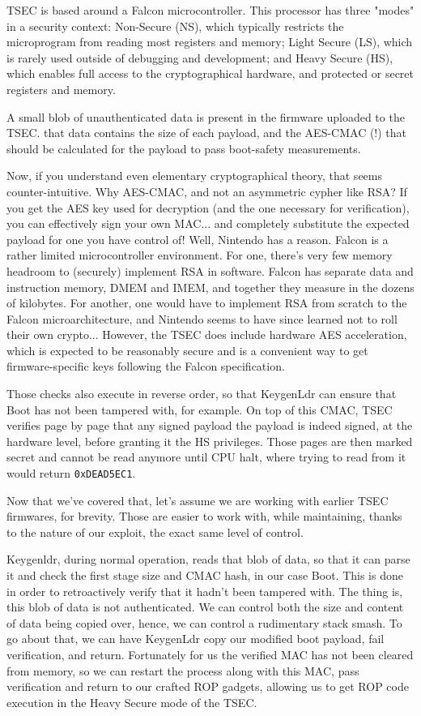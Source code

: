 \documentclass[journal]{IEEEtran}
\begin{document}
TSEC is based around a Falcon microcontroller. This processor has three "modes" in a security
context: Non-Secure (NS), which typically restricts the microprogram from reading most registers
and memory; Light Secure (LS), which is rarely used outside of debugging and development; and
Heavy Secure (HS), which enables full access to the cryptographical hardware, and protected or
secret registers and memory.

A small blob of unauthenticated data is present in the firmware uploaded to the
TSEC. that data contains the size of each payload, and the AES-CMAC (!) that should be
calculated for the payload to pass boot-safety measurements.

Now, if you understand even elementary cryptographical theory, that seems counter-intuitive. Why
AES-CMAC, and not an asymmetric cypher like RSA? If you get the AES key used for decryption (and
the one necessary for verification), you can effectively sign your own MAC... and completely substitute the
expected payload for one you have control of! Well, Nintendo has a reason. Falcon is a rather
limited microcontroller environment. For one, there's very few memory headroom to (securely)
implement RSA in software. Falcon has separate data and instruction memory, DMEM and IMEM, and
together they measure in the dozens of kilobytes. For another, one would have to implement RSA
from scratch to the Falcon microarchitecture, and Nintendo seems to have since learned not to roll
their own crypto... However, the TSEC does include hardware AES acceleration, which is expected
to be reasonably secure and is a convenient way to get firmware-specific keys
following the Falcon specification.

Those checks also execute in reverse order, so that KeygenLdr can ensure that Boot has not
been tampered with, for example. On top of this CMAC, TSEC verifies page by page that any
signed payload the payload is indeed signed, at the hardware level, before granting it the
HS privileges. Those pages are then marked secret and cannot be read anymore
until CPU halt, where trying to read from it would return \texttt{0xDEAD5EC1}. 

Now that we've covered that, let's assume we are working with earlier TSEC firmwares, for brevity.
Those are easier to work with, while maintaining, thanks to the nature of our exploit, the exact
same level of control.

Keygenldr, during normal operation, reads that blob of data, so that it can parse it and check the
first stage size and CMAC hash, in our case Boot. This is done in order to retroactively verify
that it hadn't been tampered with. The thing is, this blob of data is not authenticated.
We can control both the size and content of data being copied over, hence, we can control a
rudimentary stack smash. To go about that, we can have KeygenLdr copy our modified boot payload,
fail verification, and return. Fortunately for us the verified MAC has not been
cleared from memory, so we can restart the process along with this MAC, pass
verification and return to our crafted ROP gadgets, allowing us to get ROP code execution in the
Heavy Secure mode of the TSEC.
\end{document}
